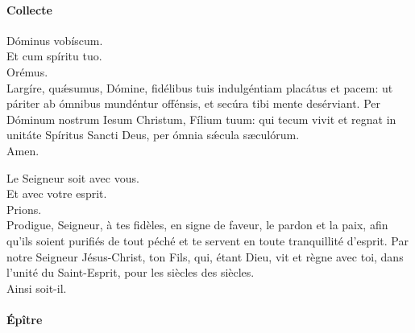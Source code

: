 \documentclass[twoside]{article}
\begin{document}
\paragraph{Collecte}

\begin{paracol}{2}

\vv Dóminus vobíscum.\\
\rr Et cum spíritu tuo.\\
\vv Orémus.\\
Largíre, quǽsumus, Dómine, fidélibus tuis indulgéntiam placátus et pacem: ut páriter ab ómnibus mundéntur offénsis, et secúra tibi mente desérviant.
Per Dóminum nostrum Iesum Christum, Fílium tuum: qui tecum vivit et regnat in unitáte Spíritus Sancti Deus, per ómnia sǽcula sæculórum.\\
\rr Amen.

\switchcolumn

\vv Le Seigneur soit avec vous. \\
\rr Et avec votre esprit.\\
\vv Prions.\\
Prodigue, Seigneur, à tes fidèles, en signe de faveur, le pardon et la paix, afin qu'ils soient purifiés de tout péché et te servent en toute tranquillité d'esprit.
Par notre Seigneur Jésus-Christ, ton Fils, qui, étant Dieu, vit et règne avec toi, dans l’unité du Saint-Esprit, pour les siècles des siècles.\\
\rr Ainsi soit-il.

\end{paracol}

\newpage

\paragraph{Épître}
\end{document}
